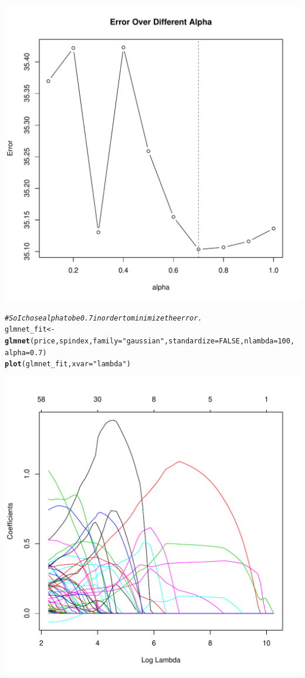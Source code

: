 \documentclass{article}\usepackage[]{graphicx}\usepackage[]{color}
\makeatletter
\def\maxwidth{ %
  \ifdim\Gin@nat@width>\linewidth
    \linewidth
  \else
    \Gin@nat@width
  \fi
}
\newcommand{\hlnum}[1]{\textcolor[rgb]{0.686,0.059,0.569}{#1}}%
\newcommand{\hlstr}[1]{\textcolor[rgb]{0.192,0.494,0.8}{#1}}%
\newcommand{\hlcom}[1]{\textcolor[rgb]{0.678,0.584,0.686}{\textit{#1}}}%
\newcommand{\hlstd}[1]{\textcolor[rgb]{0.345,0.345,0.345}{#1}}%
\newcommand{\hlkwb}[1]{\textcolor[rgb]{0.69,0.353,0.396}{#1}}%
\newcommand{\hlkwc}[1]{\textcolor[rgb]{0.333,0.667,0.333}{#1}}%
\newcommand{\hlkwd}[1]{\textcolor[rgb]{0.737,0.353,0.396}{\textbf{#1}}}%
\newenvironment{kframe}{%
 \def\at@end@of@kframe{}%
 \ifinner\ifhmode%
  \def\at@end@of@kframe{\end{minipage}}%
  \begin{minipage}{\columnwidth}%
 \fi\fi%
 \def\FrameCommand##1{\hskip\@totalleftmargin \hskip-\fboxsep
 \colorbox{shadecolor}{##1}\hskip-\fboxsep
     \hskip-\linewidth \hskip-\@totalleftmargin \hskip\columnwidth}%
 \MakeFramed {\advance\hsize-\width
   \@totalleftmargin\z@ \linewidth\hsize
   \@setminipage}}%
 {\par\unskip\endMakeFramed%
 \at@end@of@kframe}
\newenvironment{knitrout}{}{} %
\makeatother
\begin{document}
\begin{knitrout}
\includegraphics[width=\maxwidth]{figure/minimal-Stock1} 
\begin{kframe}\begin{alltt}
\hlcom{# So I chose alpha to be 0.7 in order to minimize the error.}
\hlstd{glmnet_fit} \hlkwb{<-} \hlkwd{glmnet}\hlstd{(price, spindex,} \hlkwc{family} \hlstd{=} \hlstr{"gaussian"}\hlstd{,} \hlkwc{standardize} \hlstd{=} \hlnum{FALSE}\hlstd{,} \hlkwc{nlambda} \hlstd{=} \hlnum{100}\hlstd{,}
    \hlkwc{alpha} \hlstd{=} \hlnum{0.7}\hlstd{)}
\hlkwd{plot}\hlstd{(glmnet_fit,} \hlkwc{xvar} \hlstd{=} \hlstr{"lambda"}\hlstd{)}
\end{alltt}
\end{kframe}
\includegraphics[width=\maxwidth]{figure/minimal-Stock2} 

\end{knitrout}
\end{document}
